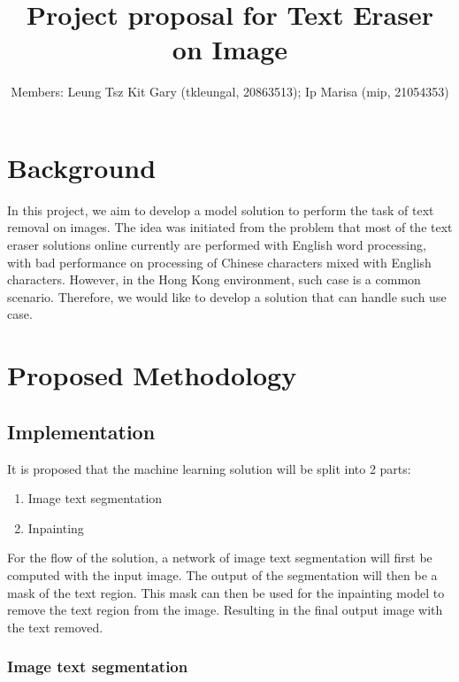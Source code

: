 \documentclass[10pt,twocolumn,letterpaper]{article}
\begin{document}
\title{Project proposal for Text Eraser on Image}

\author{
Members: Leung Tsz Kit Gary (tkleungal, 20863513);  %
Ip Marisa (mip, 21054353)
}
\maketitle

\section{Background}

In this project, we aim to develop a model solution to perform the task of text removal on images. 
The idea was initiated from the problem that most of the text eraser solutions online currently are performed with English word processing, 
with bad performance on processing of Chinese characters mixed with English characters. 
However, in the Hong Kong environment, such case is a common scenario. Therefore, we would like to develop a solution that can handle such use case.

\section{Proposed Methodology}

\subsection{Implementation}

It is proposed that the machine learning solution will be split into 2 parts:
\begin{enumerate}
    \item Image text segmentation
    \item Inpainting
\end{enumerate}

For the flow of the solution, a network of image text segmentation will first be computed with the input image.
The output of the segmentation will then be a mask of the text region.
This mask can then be used for the inpainting model to remove the text region from the image.
Resulting in the final output image with the text removed.

\subsubsection{Image text segmentation}
\end{document}
